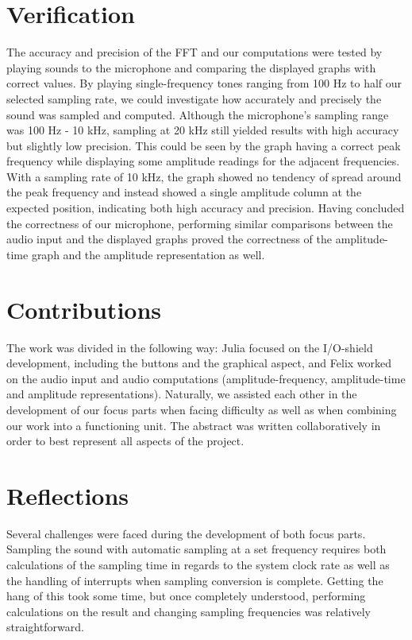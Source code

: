 \documentclass[a4paper,11pt]{article}
\begin{document}
\section*{Verification}
The accuracy and precision of the FFT and our computations were tested by playing sounds to the microphone and comparing the displayed graphs with correct values. By playing single-frequency tones ranging from 100 Hz to half our selected sampling rate, we could investigate how accurately and precisely the sound was sampled and computed. Although the microphone's sampling range was 100 Hz - 10 kHz, sampling at 20 kHz still yielded results with high accuracy but slightly low precision. This could be seen by the graph having a correct peak frequency while displaying some amplitude readings for the adjacent frequencies. With a sampling rate of 10 kHz, the graph showed no tendency of spread around the peak frequency and instead showed a single amplitude column at the expected position, indicating both high accuracy and precision. Having concluded the correctness of our microphone, performing similar comparisons between the audio input and the displayed graphs proved the correctness of the amplitude-time graph and the amplitude representation as well.


\section*{Contributions}

The work was divided in the following way: Julia focused on the I/O-shield development, including the buttons and the graphical aspect, and Felix worked on the audio input and audio computations (amplitude-frequency, amplitude-time and amplitude representations). Naturally, we assisted each other in the development of our focus parts when facing difficulty as well as when combining our work into a functioning unit. The abstract was written collaboratively in order to best represent all aspects of the project.

\section*{Reflections}

Several challenges were faced during the development of both focus parts. Sampling the sound with automatic sampling at a set frequency requires both calculations of the sampling time in regards to the system clock rate as well as the handling of interrupts when sampling conversion is complete. Getting the hang of this took some time, but once completely understood, performing calculations on the result and changing sampling frequencies was relatively straightforward.
\end{document}
